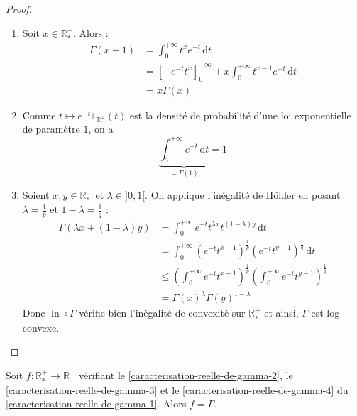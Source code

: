   \begin{proof}
    \begin{enumerate}[label={\bfseries(\roman*)}]
      \item Soit $x \in \mathbb{R}^+_*$. Alors :
      \begin{align*}
        \Gamma(x+1) &= \int_0^{+\infty} t^x e^{-t} \, \mathrm{d}t \\
        &= \left[ -e^{-t} t^x \right]_0^{+\infty} + x \int_0^{+\infty} t^{x-1} e^{-t} \, \mathrm{d}t \\
        &= x\Gamma(x)
      \end{align*}
      \item Comme $t \mapsto e^{-t} \mathbb{1}_{\mathbb{R}^+}(t)$ est la densité de probabilité d'une loi exponentielle de paramètre $1$, on a
      \[ \underbrace{\int_0^{+\infty} e^{-t} \, \mathrm{d}t}_{= \Gamma(1)} = 1 \]
      \item Soient $x, y \in \mathbb{R}^+_*$ et $\lambda \in ]0, 1[$. On applique l'inégalité de Hölder en posant $\lambda = \frac{1}{p}$ et $1-\lambda = \frac{1}{q}$ :
      \begin{align*}
        \Gamma(\lambda x + (1-\lambda) y) &= \int_0^{+\infty} e^{-t} t^{\lambda x} t^{(1-\lambda)y} \, \mathrm{d}t \\
        &= \int_0^{+\infty} (e^{-t} t^{x-1})^{\frac{1}{p}} (e^{-t} t^{y-1})^{\frac{1}{q}} \, \mathrm{d}t \\
        &\leq \left (\int_0^{+\infty} e^{-t} t^{x-1} \right)^{\frac{1}{p}} \left (\int_0^{+\infty} e^{-t} t^{y-1} \right)^{\frac{1}{q}} \\
        &= \Gamma(x)^\lambda \Gamma(y)^{1-\lambda}
      \end{align*}
      Donc $\ln \circ \Gamma$ vérifie bien l'inégalité de convexité sur $\mathbb{R}^+_*$ et ainsi, $\Gamma$ est log-convexe.
    \end{enumerate}
  \end{proof}

  \begin{theorem}
    Soit $f : \mathbb{R}^+_* \rightarrow \mathbb{R}^+$ vérifiant le \cref{caracterisation-reelle-de-gamma-2}, le \cref{caracterisation-reelle-de-gamma-3} et le \cref{caracterisation-reelle-de-gamma-4} du \cref{caracterisation-reelle-de-gamma-1}. Alors $f = \Gamma$.
  \end{theorem}

